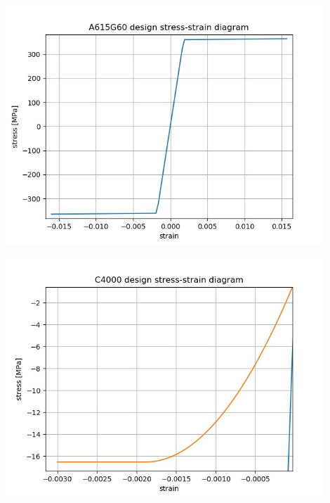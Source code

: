 \begin{center}
\includegraphics[width=120mm]{ramp_wall/resLC/text/sections/A615G60_design_stress_strain_diagram}
\end{center}
\begin{center}
\includegraphics[width=120mm]{ramp_wall/resLC/text/sections/C4000_design_stress_strain_diagram}
\end{center}
\newpage

